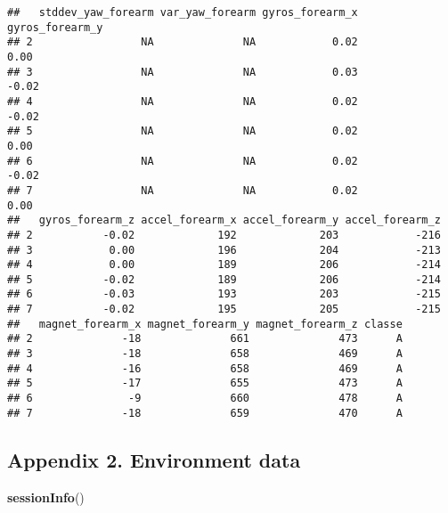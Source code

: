 \documentclass[]{article}
\newenvironment{Shaded}{\begin{snugshade}}{\end{snugshade}}
\newcommand{\KeywordTok}[1]{\textcolor[rgb]{0.13,0.29,0.53}{\textbf{#1}}}
\newcommand{\NormalTok}[1]{#1}
\begin{document}
\begin{verbatim}
##   stddev_yaw_forearm var_yaw_forearm gyros_forearm_x gyros_forearm_y
## 2                 NA              NA            0.02            0.00
## 3                 NA              NA            0.03           -0.02
## 4                 NA              NA            0.02           -0.02
## 5                 NA              NA            0.02            0.00
## 6                 NA              NA            0.02           -0.02
## 7                 NA              NA            0.02            0.00
##   gyros_forearm_z accel_forearm_x accel_forearm_y accel_forearm_z
## 2           -0.02             192             203            -216
## 3            0.00             196             204            -213
## 4            0.00             189             206            -214
## 5           -0.02             189             206            -214
## 6           -0.03             193             203            -215
## 7           -0.02             195             205            -215
##   magnet_forearm_x magnet_forearm_y magnet_forearm_z classe
## 2              -18              661              473      A
## 3              -18              658              469      A
## 4              -16              658              469      A
## 5              -17              655              473      A
## 6               -9              660              478      A
## 7              -18              659              470      A
\end{verbatim}

\subsection{Appendix 2. Environment
data}\label{appendix-2.-environment-data}

\begin{Shaded}
\begin{Highlighting}[]
\KeywordTok{sessionInfo}\NormalTok{()}
\end{Highlighting}
\end{Shaded}
\end{document}
